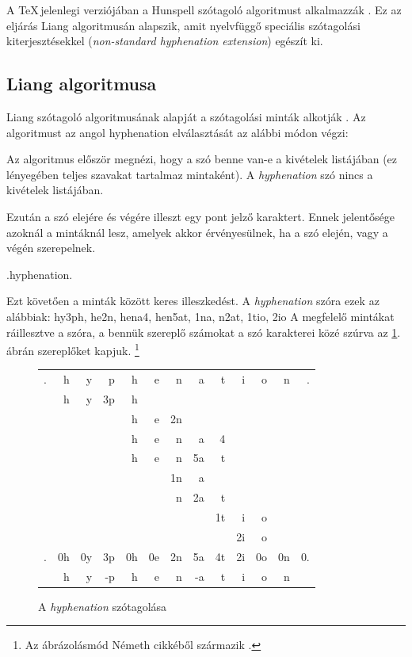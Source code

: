 \documentclass[a4paper, magyar]{article}
\begin{document}
A \TeX\,jelenlegi verziójában a Hunspell szótagoló algoritmust alkalmazzák \cite{nemeth2006automatic}. Ez az eljárás Liang algoritmusán alapszik, amit nyelvfüggő speciális szótagolási kiterjesztésekkel (\textit{non-standard hyphenation extension}) egészít ki.
\subsection{Liang algoritmusa}
Liang szótagoló algoritmusának alapját a szótagolási minták alkotják \cite{liang1983word}. Az algoritmust az angol 
{\selectfont
	hyphenation%
} elválasztását az alábbi módon végzi:

Az algoritmus először megnézi, hogy a szó benne van-e a kivételek listájában (ez lényegében teljes szavakat tartalmaz mintaként). A \textit{hyphenation} szó nincs a kivételek listájában.

Ezután a szó elejére és végére illeszt egy pont  jelző karaktert. Ennek jelentősége azoknál a mintáknál lesz, amelyek akkor érvényesülnek, ha a szó elején, vagy a végén szerepelnek.
{\selectfont
	\begin{center}
	.hyphenation.
	\end{center}
}
Ezt követően a minták között keres illeszkedést. A \textit{hyphenation} szóra ezek az alábbiak: 
{\selectfont hy3ph, he2n, hena4, hen5at, 1na, n2at, 1tio,  2io}  \cite[37.\ oldal]{liang1983word}
A megfelelő mintákat ráillesztve a szóra, a bennük szereplő számokat a szó karakterei közé szúrva az \ref{liang-hyp}. ábrán szereplőket kapjuk.%
\footnote{Az ábrázolásmód N{\'e}meth cikkéből származik \cite{nemeth2006automatic}.}
\begin{figure}[ht]\centering
	{\selectfont
		\setlength{\tabcolsep}{0pt}
		\begin{tabular}{rrrrrrrrrrrrr}
			.& h& y& p& h& e& n& a & t& i& o& n& .\\
			 & h& y&3p& h\\
			 &  &  &  & h& e&2n\\
			 &  &  &  & h& e& n& a&4\phantom{t}\\
			 &  &  &  & h& e& n&5a&t\\
			 &  &  &  &  &  &1n& a\\
			 &  &  &  &  &  & n&2a& t\\
			 &  &  &  &  &  &  &  &1t& i& o\\
			 &  &  &  &  &  &  &  &  &2i& o\\
			 \hline
			 .&0h&0y&3p&0h&0e&2n&5a&4t&2i&0o&0n&0.\\
			  & h& y&-p& h& e& n&-a& t& i& o& n
		\end{tabular}
	}
\caption{A \textit{hyphenation} szótagolása}\par\medskip\centering
\label{liang-hyp}
\end{figure}
\end{document}
